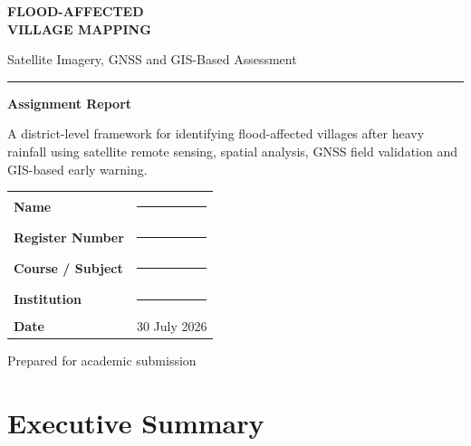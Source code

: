 \documentclass[11pt,a4paper]{article}
\begin{document}
\hypersetup{pageanchor=false}

\begin{titlepage}
\thispagestyle{empty}
\centering
\vspace*{18mm}
{\sffamily\bfseries\fontsize{25}{30}\selectfont\color{Primary} FLOOD-AFFECTED\\[2mm] VILLAGE MAPPING\par}
\vspace{6mm}
{\sffamily\Large\color{Secondary}Satellite Imagery, GNSS and GIS-Based Assessment\par}
\vspace{8mm}
{\color{Primary}\rule{0.72\textwidth}{1.2pt}\par}
\vspace{16mm}
\begin{summarybox}
\centering
{\sffamily\large\bfseries Assignment Report}\par
\vspace{2mm}
A district-level framework for identifying flood-affected villages after heavy rainfall using satellite remote sensing, spatial analysis, GNSS field validation and GIS-based early warning.
\end{summarybox}
\vfill
\begin{tabularx}{0.82\textwidth}{>{\bfseries\sffamily}l X}
Name & \rule{0.98\linewidth}{0.4pt}\\[6mm]
Register Number & \rule{0.98\linewidth}{0.4pt}\\[6mm]
Course / Subject & \rule{0.98\linewidth}{0.4pt}\\[6mm]
Institution & \rule{0.98\linewidth}{0.4pt}\\[6mm]
Date & 30 July 2026\\
\end{tabularx}
\vfill
{\sffamily\small\color{TextGray}Prepared for academic submission\par}
\end{titlepage}

\hypersetup{pageanchor=true}
\tableofcontents
\clearpage
{}

\section{Executive Summary}\label{executive-summary}
\end{document}
